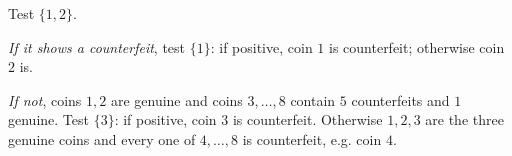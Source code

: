 Test $\{1,2\}$.

\emph{If it shows a counterfeit}, test $\{1\}$: if positive, coin $1$ is counterfeit; otherwise coin $2$ is.

\emph{If not}, coins $1,2$ are genuine and coins $3,\dots,8$ contain $5$ counterfeits and $1$ genuine. Test $\{3\}$: if positive, coin $3$ is counterfeit. Otherwise $1,2,3$ are the three genuine coins and every one of $4,\dots,8$ is counterfeit, e.g. coin $4$.
